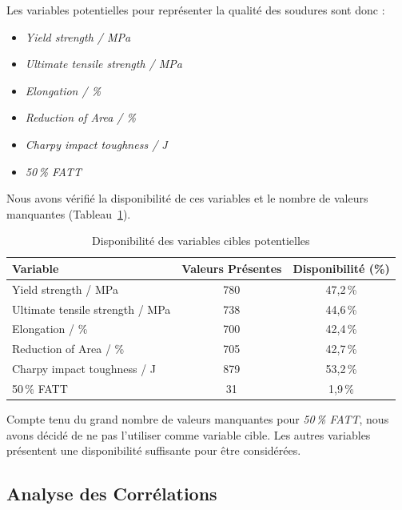 \documentclass{article}
\begin{document}
\vspace{0.25cm}

Les variables potentielles pour représenter la qualité des soudures sont donc :

\begin{itemize}
    \item \textit{Yield strength / MPa}
    \item \textit{Ultimate tensile strength / MPa}
    \item \textit{Elongation / \%}
    \item \textit{Reduction of Area / \%}
    \item \textit{Charpy impact toughness / J}
    \item \textit{50\,\% FATT}
\end{itemize}

\vspace{0.25cm}

Nous avons vérifié la disponibilité de ces variables et le nombre de valeurs manquantes (Tableau~\ref{tab:missing_targets}).

\begin{table}[H]
    \centering
    \begin{tabular}{lcc}
    \toprule
    \textbf{Variable} & \textbf{Valeurs Présentes} & \textbf{Disponibilité (\%)} \\
    \midrule
    Yield strength / MPa & 780 & 47,2\,\% \\
    Ultimate tensile strength / MPa & 738 & 44,6\,\% \\
    Elongation / \% & 700 & 42,4\,\% \\
    Reduction of Area / \% & 705 & 42,7\,\% \\
    Charpy impact toughness / J & 879 & 53,2\,\% \\
    50\,\% FATT & 31 & 1,9\,\% \\
    \bottomrule
    \end{tabular}
    \caption{Disponibilité des variables cibles potentielles}
    \label{tab:missing_targets}
\end{table}

Compte tenu du grand nombre de valeurs manquantes pour \textit{50\,\% FATT}, nous avons décidé de ne pas l'utiliser comme variable cible. Les autres variables présentent une disponibilité suffisante pour être considérées.

\subsection{Analyse des Corrélations}
\end{document}
